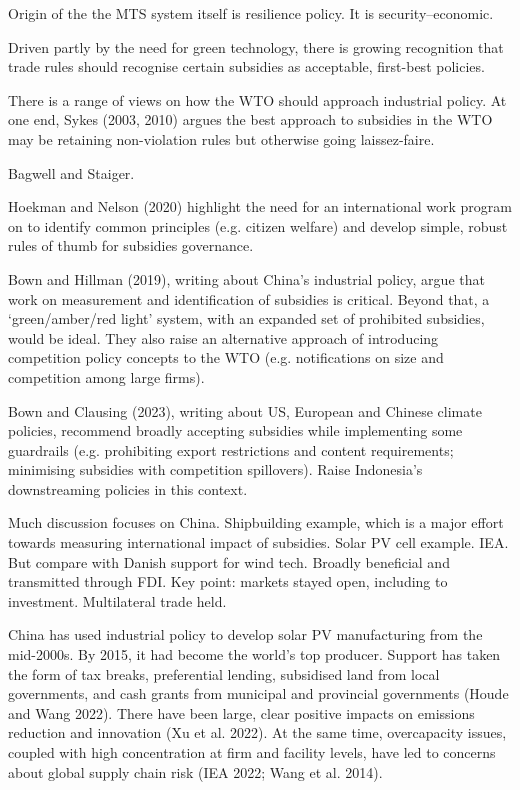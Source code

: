 \documentclass{article}
\begin{document}
Origin of the the MTS system itself is resilience policy. It is security--economic.

Driven partly by the need for green technology, there is growing recognition that trade rules should recognise certain subsidies as acceptable, first-best policies.

There is a range of views on how the WTO should approach industrial policy. At one end, Sykes (2003, 2010) argues the best approach to subsidies in the WTO may be retaining non-violation rules but otherwise going laissez-faire.

Bagwell and Staiger.

Hoekman and Nelson (2020) highlight the need for an international work program on to identify common principles (e.g. citizen welfare) and develop simple, robust rules of thumb for subsidies governance.

Bown and Hillman (2019), writing about China’s industrial policy, argue that work on measurement and identification of subsidies is critical. Beyond that, a ‘green/amber/red light’ system, with an expanded set of prohibited subsidies, would be ideal. They also raise an alternative approach of introducing competition policy concepts to the WTO (e.g. notifications on size and competition among large firms).

Bown and Clausing (2023), writing about US, European and Chinese climate policies, recommend broadly accepting subsidies while implementing some guardrails (e.g. prohibiting export restrictions and content requirements; minimising subsidies with competition spillovers). Raise Indonesia's downstreaming policies in this context.

Much discussion focuses on China. Shipbuilding example, which is a major effort towards measuring international impact of subsidies. Solar PV cell example. IEA. But compare with Danish support for wind tech. Broadly beneficial and transmitted through FDI. Key point: markets stayed open, including to investment. Multilateral trade held.

China has used industrial policy to develop solar PV manufacturing from the mid-2000s. By 2015, it had become the world’s top producer. Support has taken the form of tax breaks, preferential lending, subsidised land from local governments, and cash grants from municipal and provincial governments (Houde and Wang 2022). There have been large, clear positive impacts on emissions reduction and innovation (Xu et al. 2022). At the same time, overcapacity issues, coupled with high concentration at firm and facility levels, have led to concerns about global supply chain risk (IEA 2022; Wang et al. 2014).  
\end{document}
